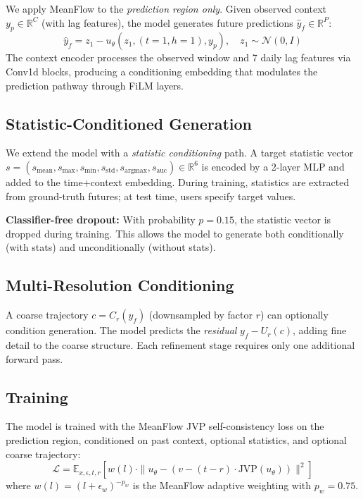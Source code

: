 \documentclass{article}
\begin{document}
We apply MeanFlow to the \emph{prediction region only}. Given observed context $y_p \in \mathbb{R}^{C}$ (with lag features), the model generates future predictions $\hat{y}_f \in \mathbb{R}^{P}$:
\begin{equation}
    \hat{y}_f = z_1 - u_\theta(z_1, (t\!=\!1, h\!=\!1), y_p), \quad z_1 \sim \mathcal{N}(0, I)
\end{equation}
The context encoder processes the observed window and 7 daily lag features via Conv1d blocks, producing a conditioning embedding that modulates the prediction pathway through FiLM layers.

\subsection{Statistic-Conditioned Generation}

We extend the model with a \emph{statistic conditioning} path. A target statistic vector $s = (s_{\text{mean}}, s_{\text{max}}, s_{\text{min}}, s_{\text{std}}, s_{\text{argmax}}, s_{\text{auc}}) \in \mathbb{R}^6$ is encoded by a 2-layer MLP and added to the time+context embedding. During training, statistics are extracted from ground-truth futures; at test time, users specify target values.

\textbf{Classifier-free dropout:} With probability $p=0.15$, the statistic vector is dropped during training. This allows the model to generate both conditionally (with stats) and unconditionally (without stats).

\subsection{Multi-Resolution Conditioning}

A coarse trajectory $c = C_r(y_f)$ (downsampled by factor $r$) can optionally condition generation. The model predicts the \emph{residual} $y_f - U_r(c)$, adding fine detail to the coarse structure. Each refinement stage requires only one additional forward pass.

\subsection{Training}

The model is trained with the MeanFlow JVP self-consistency loss on the prediction region, conditioned on past context, optional statistics, and optional coarse trajectory:
\begin{equation}
    \mathcal{L} = \mathbb{E}_{x, \epsilon, t, r} \left[ w(l) \cdot \| u_\theta - (v - (t-r) \cdot \text{JVP}(u_\theta)) \|^2 \right]
\end{equation}
where $w(l) = (l + \epsilon_w)^{-p_w}$ is the MeanFlow adaptive weighting with $p_w = 0.75$.
\end{document}
